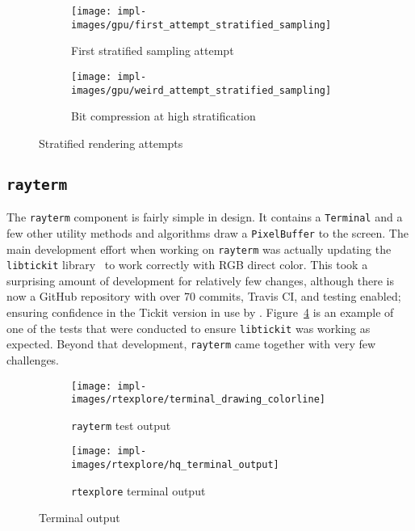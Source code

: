 \vspace{0.3em}
\begin{figure}[htb]
  \centering
  \begin{subfigure}[htb]{0.45\textwidth}
    \texttt{[image: impl-images/gpu/first\_attempt\_stratified\_sampling]}
    \caption{First stratified sampling attempt}
\label{fig:rayterm-gpu_stratified}
  \end{subfigure}
  \begin{subfigure}[htb]{0.45\textwidth}
    \texttt{[image: impl-images/gpu/weird\_attempt\_stratified\_sampling]}
    \caption{Bit compression at high stratification}
\label{fig:rayterm-gpu_bit_compression}
  \end{subfigure}
  \caption{Stratified rendering attempts}
\label{fig:rayterm-gpu_stratified}
\end{figure}

\subsection{\texttt{rayterm}}\label{ch:implementation:final:rayterm}

The \texttt{rayterm} component is fairly simple in design.
It contains a \texttt{Terminal} and a few other utility methods and algorithms draw a \texttt{PixelBuffer} to the screen.
The main development effort when working on \texttt{rayterm} was actually updating the \texttt{libtickit} library~\cite{libtickitLibrary, libtickitCustom} to work correctly with RGB direct color.
This took a surprising amount of development for relatively few changes, although there is now a GitHub repository with over 70 commits, Travis CI, and testing enabled; ensuring confidence in the Tickit version in use by \name{}.
Figure~\ref{fig:terminal_colorline} is an example of one of the tests that were conducted to ensure \texttt{libtickit} was working as expected.
Beyond that development, \texttt{rayterm} came together with very few challenges.

\vspace{0.3em}
\begin{figure}[htb]
  \centering
  \begin{subfigure}[htb]{0.48\textwidth}
    \texttt{[image: impl-images/rtexplore/terminal\_drawing\_colorline]}
    \caption{\texttt{rayterm} test output}
\label{fig:terminal_colorline}
  \end{subfigure}
  \begin{subfigure}[htb]{0.48\textwidth}
    \texttt{[image: impl-images/rtexplore/hq\_terminal\_output]}
    \caption{\texttt{rtexplore} terminal output}
\label{fig:rtexplore_terminal}
  \end{subfigure}
  \caption{Terminal output}
\label{fig:rayterm_terminal_output}
\end{figure}

